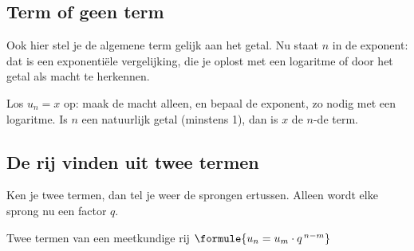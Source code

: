 \subsection{Term of geen term}

Ook hier stel je de algemene term gelijk aan het getal. Nu staat $n$ in de exponent: dat is een exponentiële vergelijking, die je oplost met een logaritme of door het getal als macht te herkennen.


\begin{werkwijze}
Los $u_n = x$ op: maak de macht alleen, en bepaal de exponent, zo nodig met een logaritme. Is $n$ een natuurlijk getal (minstens 1), dan is $x$ de $n$-de term.
\end{werkwijze}


\begin{oefeningen}
\end{oefeningen}

\subsection{De rij vinden uit twee termen}

Ken je twee termen, dan tel je weer de sprongen ertussen. Alleen wordt elke sprong nu een factor $q$.

\begin{theorie}
\begin{stelling}{Twee termen van een meetkundige rij}
\qquad $\formule{u_n = u_m \cdot q^{\,n-m}}$
\end{stelling}
\end{theorie}

